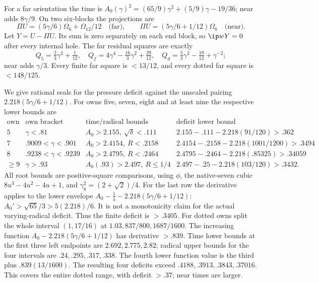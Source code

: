 For a far orientation the time is
\(A_0(\gamma)^2=(65/9)\gamma^2+(5/9)\gamma-19/36\);
near adds \(8\gamma/9\).
On two six-blocks the projections are
\[
 \Pi U=(5\gamma/6)\Omega_6+\Omega_{12}/12\quad\text{(far)},\qquad
 \Pi U=(5\gamma/6+1/12)\Omega_6\quad\text{(near)} .
\]
Let \(Y=U-\Pi U\). Its sum is zero separately on each end block,
so \(\ip wY=0\) after every internal hole.
The far residual squares are exactly
\[
 Q_5=\tfrac23\gamma^2+\tfrac1{12},\quad
 Q_f=4\gamma^4-\tfrac{16}3\gamma^2+\tfrac{29}{12},\quad
 Q_d=\tfrac53\gamma^2-\tfrac{19}{12}+\gamma^{-2};
\]
near adds \(\gamma/3\).
Every finite far square is \(<13/12\), and every dotted far square
is \(<148/125\).

We give rational seals for the pressure deficit against the unscaled
pairing \(2.218(5\gamma/6+1/12)\).
For owns five, seven, eight and at least nine the respective lower bounds
are
\[
\begin{array}{c|c|c|c}
\text{own}&\text{own bracket}&\text{time/radical bounds}&
 \text{deficit lower bound}\\ \hline
5&\gamma<.81&A_0>2.155,\ \sqrt\delta<.111&
 2.155-.111-2.218(91/120)>.362\\
7&.9009<\gamma<.901&A_0>2.4154,\ R<.2158&
 2.4154-.2158-2.218(1001/1200)>.3494\\
8&.9238<\gamma<.9239&A_0>2.4795,\ R<.2464&
 2.4795-.2464-2.218(.85325)>.34059\\
\geq9&\gamma>.93&A_0(.93)>2.497,\ R\leq1/4&
 2.497-.25-2.218(103/120)>.3432 .
\end{array}
\]
All root bounds are positive-square comparisons, using
\(\phi\), the native-seven cubic \(8u^3-4u^2-4u+1\), and
\(\gamma_8^2=(2+\sqrt2)/4\).
For the last row the derivative applies to the lower envelope
\(A_0-\tfrac14-2.218(5\gamma/6+1/12)\):
\(A_0'>\sqrt{65}/3>5(2.218)/6\).
It is not a monotonicity claim for the actual varying-radical deficit.
Thus the finite deficit is \(>.3405\).
For dotted owns split the whole interval \((1,17/16)\) at
\(1.03,837/800,1687/1600\).
The increasing function \(A_0-2.218(5\gamma/6+1/12)\) has
derivative \(>.839\).
Time lower bounds at the first three left endpoints are
\(2.692,2.775,2.82\); radical upper bounds for the four intervals
are \(.24,.295,.317,.338\).
The fourth lower function value is the third plus
\(.839(13/1600)\).
The resulting four deficits exceed
\(.4188,.3913,.3843,.37016\).
This covers the entire dotted range, with deficit \(>.37\);
near times are larger.

